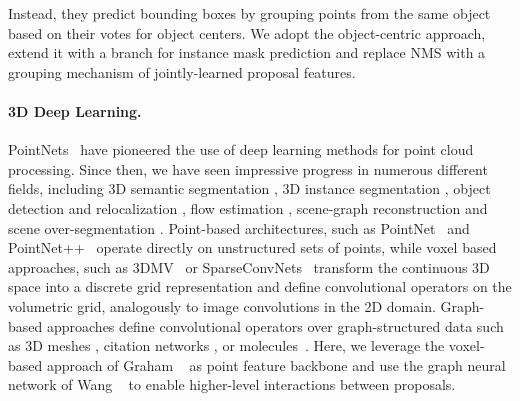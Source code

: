\documentclass[10pt,twocolumn,letterpaper]{article}
\newcommand{\parag}[1]{\vspace{0px}\paragraph{#1}\hspace{-9pt}}
\begin{document}
Instead, they predict bounding boxes by grouping points from the same object based on their votes for object centers.
We adopt the object-centric approach, extend it with a branch for instance mask prediction and replace NMS with a grouping mechanism of jointly-learned proposal features.
\vspace{-10px}
\parag{3D Deep Learning.}
PointNets~\cite{Qi17CVPR} have pioneered the use of deep learning methods for point cloud processing.
Since then, we have seen impressive progress in numerous different fields, including 3D semantic segmentation \cite{Graham18CVPR, Engelmann18ECCVW, Landrieu17CVPR, Qi17CVPR, Qi17NIPS, Tatarchenko18CVPR, Wang18CoRR}, 3D instance segmentation \cite{ElichGCPR19, Hou19CVPR, Lahoud19ICCV, Wang19CVPR, Yang19CVPR, Li19CVPR}, object detection \cite{Hou19CVPR, Qi19ICCV, Zhou18CVPR} and relocalization \cite{Wald19ICCV}, flow estimation \cite{Behl19CVPR, Liu19CVPR, Wang18CVPRa}, scene-graph reconstruction \cite{Armeni19ICCV} and scene over-segmentation \cite{Landrieu19CVPR}.
Point-based architectures, such as PointNet~\cite{Qi19ICCV} and PointNet++~\cite{Qi17ICCV} operate directly on unstructured sets of points, while voxel based approaches, such as 3DMV~\cite{Dai18ECCV} or SparseConvNets~\cite{Choy19CVPR, Graham18CVPR} transform the continuous 3D space into a discrete grid representation and define convolutional operators on the volumetric grid, analogously to image convolutions in the 2D domain. Graph-based approaches \cite{Li16ICLR, Kipf17ICLR, Wang18CoRR} define convolutional operators over graph-structured data such as 3D meshes \cite{Hanocka19ACM, Schult20CVPR}, citation networks \cite{Kipf17ICLR}, or molecules~\cite{Duvenaud15NIPS}.
Here, we leverage the voxel-based approach of Graham \etal~\cite{Graham18CVPR} as point feature backbone and use the graph neural network of Wang \etal~\cite{Wang18CoRR} to enable higher-level interactions between proposals.
\end{document}
